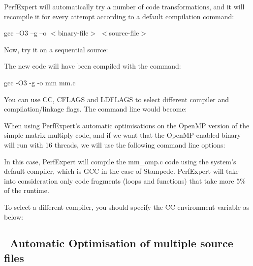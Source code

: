 PerfExpert will automatically try a number of code transformations, and it will recompile it for every attempt according to a default compilation command:

\begin{prompt}
gcc --O3 --g --o $<$binary-file$>$  $<$source-file$>$
\end{prompt}

Now, try it on a sequential source:

\begin{prompt}
\end{prompt}

The new code will have been compiled with the command:
\begin{prompt}
gcc -O3 -g -o mm mm.c
\end{prompt}

You can use CC, CFLAGS and LDFLAGS to select different compiler and compilation/linkage flags. The command line would become:
\begin{prompt}
\end{prompt}

When using PerfExpert's automatic optimisations on the OpenMP version of the simple matrix multiply code, and if we want that the OpenMP-enabled binary will run with 16 threads, we will use the following command line options:
\begin{prompt}
\end{prompt}

In this case, PerfExpert will compile the mm_omp.c code using the system's default compiler, which is GCC in the case of Stampede. PerfExpert will take into consideration only code fragments (loops and functions) that take more 5\% of the runtime.

To select a different compiler, you should specify the CC environment variable as below:
\begin{prompt}
\end{prompt}

\subsection{~Automatic Optimisation of multiple source files}
\label{subsec:Automatic_Optimization_multiple}

